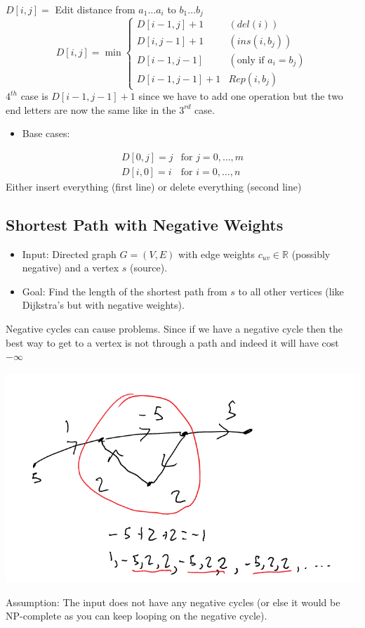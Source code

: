 \documentclass[11pt]{article}
\begin{document}
\(D[i,j]=\) Edit distance from \(a_1 \ldots a_i\) to \(b_1 \ldots b_j\)
\begin{equation*}
D[i,j] = \min 
\begin{cases}
D[i-1,j]+1 & (del(i))
\\ D[i,j-1]+1 & (ins(i,b_j))
\\ D[i-1, j-1] & (\text{only if $a_i=b_j$})
\\ D[i-1, j-1]+1 & Rep(i,b_j)
\end{cases}
\end{equation*}
\(4^{th}\) case is \(D[i-1, j-1]+1\) since we have to add one operation but the two end letters are now the same like in the \(3^{rd}\) case.
\begin{itemize}
\item Base cases:
\end{itemize}
\begin{align*}
D[0,j] = j & \text{for }j=0,\ldots,m
\\D[i,0] = i & \text{for }i=0,\ldots,n
\end{align*}
Either insert everything (first line) or delete everything (second line)
\subsection{Shortest Path with Negative Weights}
\label{sec:org9a0203a}
\begin{itemize}
\item Input: Directed graph \(G=(V,E)\) with edge weights \(c_{uv}\in \mathbb{R}\) (possibly negative) and a vertex \(s\) (source).
\item Goal: Find the length of the shortest path from \(s\) to all other vertices (like Dijkstra's but with negative weights).
\end{itemize}
Negative cycles can cause problems. Since if we have a negative cycle then the best way to get to a vertex is not through a path and indeed it will have cost \(-\infty\)
\begin{center}
\includegraphics[width=.9\linewidth]{./Images/i93.png}
\end{center}
Assumption: The input does not have any negative cycles (or else it would be NP-complete as you can keep looping on the negative cycle).
\end{document}
